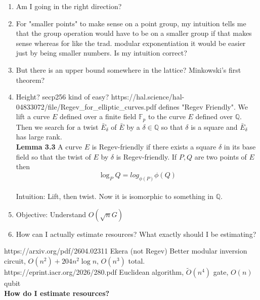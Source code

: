 \documentclass{article}
\begin{document}
\begin{enumerate}
	\item Am I going in the right direction?
	\item For "smaller points" to make sense on a point group, my intuition tells me that the group operation would have to be on a smaller group if that makes sense whereas for like the trad. modular exponentiation it would be easier just by being smaller numbers. Is my intuition correct?
	\item But there is an upper bound somewhere in the lattice? Minkowski's first theorem?
	\item Height? secp256 kind of easy? https://hal.science/hal-04833072/file/Regev\_for\_elliptic\_curves.pdf defines "Regev Friendly". We lift a curve $E$ defined over a finite field $\mathbb{F}_p$ to the curve $E$ defined over $\mathbb{Q}$. Then we search for a twist $\bar{E}_\delta$ of $\bar{E}$ by a $\delta \in \mathbb{Q}$ so that $\delta$ is a square and $\bar{E}_\delta$ has large rank.\\
		\textbf{Lemma 3.3} A curve $E$ is Regev-friendly if there exists a square $\delta$ in its base field so that the twist of $E$ by $\delta$ is Regev-friendly. If $P,Q$ are two points of $E$ then
		$$\log_P Q = log_{\phi(P)} \phi (Q)$$\\
		Intuition: Lift, then twist. Now it is isomorphic to something in $\mathbb{Q}.$
	\item Objective: Understand $O(\sqrt{n} G)$ 
	\item How can I actually estimate resources? What exactly should I be estimating?
\end{enumerate}
https://arxiv.org/pdf/2604.02311 Ekera (not Regev) Better modular inversion circuit, $O(n^2) + 204n^2 \log n$, $O(n^3)$ total.\\
https://eprint.iacr.org/2026/280.pdf Euclidean algorithm, $\tilde{O}(n^4)$ gate, $O(n)$ qubit\\
\textbf{How do I estimate resources?}\\
\newpage
\end{document}

